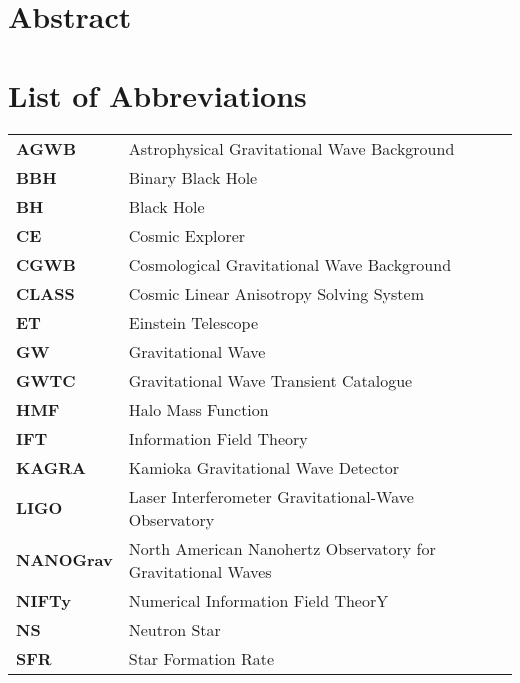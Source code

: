 \documentclass[twoside, 11pt, openany]{book}
\begin{document}
\setcounter{tocdepth}{3}
{}

\chapter*{Abstract}


\chapter*{List of Abbreviations}

\begin{table}[h]
        \begin{tabular}{l l}
            \textbf{AGWB} & Astrophysical Gravitational Wave Background
            \\
            \textbf{BBH} & Binary Black Hole
            \\
            \textbf{BH} & Black Hole
            \\
            \textbf{CE} & Cosmic Explorer
            \\
            \textbf{CGWB} & Cosmological Gravitational Wave Background
            \\
            \textbf{CLASS} & Cosmic Linear Anisotropy Solving System 
            \\
            \textbf{ET} & Einstein Telescope
            \\
            \textbf{GW} & Gravitational Wave
            \\
            \textbf{GWTC} & Gravitational Wave Transient Catalogue
            \\
            \textbf{HMF} & Halo Mass Function
            \\
            \textbf{IFT} & Information Field Theory
            \\
            \textbf{KAGRA} & Kamioka Gravitational Wave Detector
            \\
            \textbf{LIGO} & Laser Interferometer Gravitational-Wave Observatory
            \\
            \textbf{NANOGrav} & North American Nanohertz Observatory for Gravitational Waves
            \\
            \textbf{NIFTy} & Numerical Information Field TheorY
            \\
            \textbf{NS} & Neutron Star
            \\
            \textbf{SFR} & Star Formation Rate

        \end{tabular}
\end{table}
\end{document}
